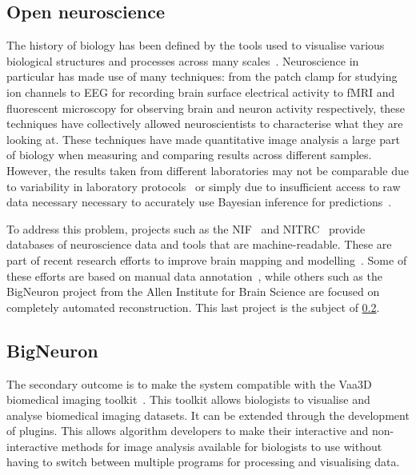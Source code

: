 \subsection{Open neuroscience}
The history of biology has been defined by the tools used to
visualise various biological structures and processes across many
scales~\cite{moore2012visualizing}. Neuroscience in particular has
made use of many techniques: from the patch clamp for studying ion
channels to \acrshort{EEG} for recording brain surface electrical
activity to \acrshort{fMRI} and fluorescent microscopy for
observing brain and neuron activity respectively, these techniques
have collectively allowed neuroscientists to characterise what
they are looking at.  These techniques have made quantitative
image analysis a large part of biology when measuring and
comparing results across different samples. However, the results
taken from different laboratories may not be comparable due to
variability in laboratory protocols~\autocite{NeuroMorphVariability:Parekh:2015}
or simply due to insufficient access to raw data necessary
necessary to accurately use Bayesian inference for
predictions~\autocite{Poldrack2011}.

To address this problem, projects such as the \acrfull{NIF}~\cite{Gardner2008}
and \acrfull{NITRC}~\cite{Kennedy2016} provide databases of neuroscience data
and tools that are machine-readable. These are part of recent research efforts
to improve brain mapping and modelling~\autocite{Markram2013,BigBrainIEEESpectrum:2013}.
Some of these efforts are based on manual data annotation~\autocite{Ascoli2007,Helmstaedter2011,Helmstaedter2012,Marx2013},
while others such as the BigNeuron project from the Allen Institute for
Brain Science are focused on completely automated reconstruction. This last
project is the subject of \cref{subsec:bigneuron}.

\subsection{BigNeuron}\label{subsec:bigneuron}

{ %
	The secondary outcome is to make the system compatible
	with the Vaa3D biomedical imaging toolkit~\autocite{Vaa3D:site:2015,Vaa3D:Peng:2010,Vaa3D:Peng:2014}.
	This toolkit allows biologists to visualise and analyse
	biomedical imaging datasets. It can be extended through
	the development of plugins. This allows algorithm
	developers to make their interactive and
	non-interactive methods for image analysis available
	for biologists to use without having to switch between
	multiple programs for processing and visualising data.
}

